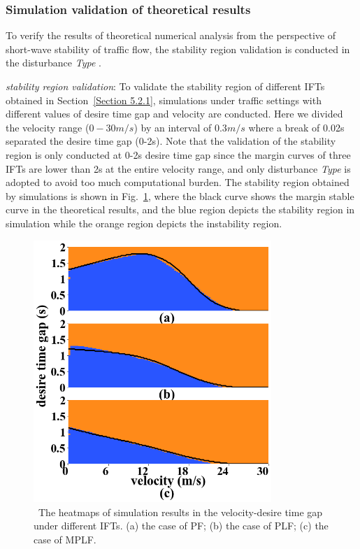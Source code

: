 \documentclass[journal]{IEEEtran}
\begin{document}
\subsubsection{Simulation validation of theoretical results}
\label{Section 5.2.3}


To verify the results of theoretical numerical analysis from the perspective of short-wave stability of traffic flow, the stability region validation is conducted in the disturbance \textit{Type \uppercase\expandafter{}}.


\textit{stability region validation}: To validate the stability region of different IFTs obtained in Section~\ref{Section 5.2.1}, simulations under traffic settings with different values of desire time gap and velocity are conducted. Here we divided the velocity range ($0-30 m/s$) by an interval of $0.3 m/s$ where a break of 0.02s separated the desire time gap (0-2s). Note that the validation of the stability region is only conducted at 0-2s desire time gap since the margin curves of three IFTs are lower than 2s at the entire velocity range, and only disturbance \textit{Type \uppercase\expandafter{}} is adopted to avoid too much computational burden. The stability region obtained by simulations is shown in Fig.~\ref{Figure5.2.3}, where the black curve shows the margin stable curve in the theoretical results, and the blue region depicts the stability region in simulation while the orange region depicts the instability region.


\begin{figure}
  \includegraphics[width=9cm]{figextend1.png}
  \caption{~The heatmaps of simulation results in the velocity-desire time gap under different IFTs. (a) the case of PF; (b) the case of PLF; (c) the case of MPLF.}
  \label{Figure5.2.3}
\end{figure}
\end{document}
